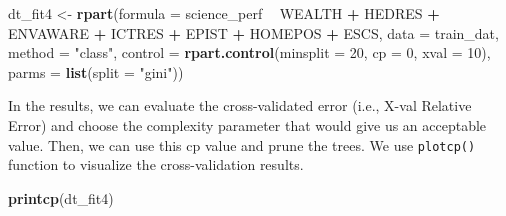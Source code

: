 \documentclass[]{book}
\newenvironment{Shaded}{\begin{snugshade}}{\end{snugshade}}
\newcommand{\DataTypeTok}[1]{\textcolor[rgb]{0.13,0.29,0.53}{#1}}
\newcommand{\DecValTok}[1]{\textcolor[rgb]{0.00,0.00,0.81}{#1}}
\newcommand{\KeywordTok}[1]{\textcolor[rgb]{0.13,0.29,0.53}{\textbf{#1}}}
\newcommand{\NormalTok}[1]{#1}
\newcommand{\OperatorTok}[1]{\textcolor[rgb]{0.81,0.36,0.00}{\textbf{#1}}}
\newcommand{\StringTok}[1]{\textcolor[rgb]{0.31,0.60,0.02}{#1}}
\begin{document}
\begin{Shaded}
\begin{Highlighting}[]
\NormalTok{dt_fit4 <-}\StringTok{ }\KeywordTok{rpart}\NormalTok{(}\DataTypeTok{formula =}\NormalTok{ science_perf }\OperatorTok{~}\StringTok{ }\NormalTok{WEALTH }\OperatorTok{+}\StringTok{ }\NormalTok{HEDRES }\OperatorTok{+}\StringTok{ }\NormalTok{ENVAWARE }\OperatorTok{+}\StringTok{ }\NormalTok{ICTRES }\OperatorTok{+}\StringTok{ }
\StringTok{                   }\NormalTok{EPIST }\OperatorTok{+}\StringTok{ }\NormalTok{HOMEPOS }\OperatorTok{+}\StringTok{ }\NormalTok{ESCS,}
                 \DataTypeTok{data =}\NormalTok{ train_dat,}
                 \DataTypeTok{method =} \StringTok{"class"}\NormalTok{, }
                 \DataTypeTok{control =} \KeywordTok{rpart.control}\NormalTok{(}\DataTypeTok{minsplit =} \DecValTok{20}\NormalTok{,}
                                         \DataTypeTok{cp =} \DecValTok{0}\NormalTok{,}
                                         \DataTypeTok{xval =} \DecValTok{10}\NormalTok{),}
                \DataTypeTok{parms =} \KeywordTok{list}\NormalTok{(}\DataTypeTok{split =} \StringTok{"gini"}\NormalTok{))}
\end{Highlighting}
\end{Shaded}

In the results, we can evaluate the cross-validated error (i.e., X-val Relative Error) and choose the complexity parameter that would give us an acceptable value. Then, we can use this cp value and prune the trees. We use \texttt{plotcp()} function to visualize the cross-validation results.

\begin{Shaded}
\begin{Highlighting}[]
\KeywordTok{printcp}\NormalTok{(dt_fit4)}
\end{Highlighting}
\end{Shaded}
\end{document}
